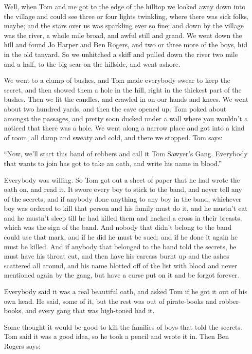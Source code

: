 \documentclass[10pt,a4paper]{article}
\begin{document}
Well, when Tom and me got to the edge of the hilltop we looked away down into the village and could see three or four lights twinkling, where there was sick folks, maybe; and the stars over us was sparkling ever so fine; and down by the village was the river, a whole mile broad, and awful still and grand. We went down the hill and found Jo Harper and Ben Rogers, and two or three more of the boys, hid in the old tanyard. So we unhitched a skiff and pulled down the river two mile and a half, to the big scar on the hillside, and went ashore.

We went to a clump of bushes, and Tom made everybody swear to keep the secret, and then showed them a hole in the hill, right in the thickest part of the bushes. Then we lit the candles, and crawled in on our hands and knees. We went about two hundred yards, and then the cave opened up. Tom poked about amongst the passages, and pretty soon ducked under a wall where you wouldn’t a noticed that there was a hole. We went along a narrow place and got into a kind of room, all damp and sweaty and cold, and there we stopped. Tom says:

“Now, we’ll start this band of robbers and call it Tom Sawyer’s Gang. Everybody that wants to join has got to take an oath, and write his name in blood.”

Everybody was willing. So Tom got out a sheet of paper that he had wrote the oath on, and read it. It swore every boy to stick to the band, and never tell any of the secrets; and if anybody done anything to any boy in the band, whichever boy was ordered to kill that person and his family must do it, and he mustn’t eat and he mustn’t sleep till he had killed them and hacked a cross in their breasts, which was the sign of the band. And nobody that didn’t belong to the band could use that mark, and if he did he must be sued; and if he done it again he must be killed. And if anybody that belonged to the band told the secrets, he must have his throat cut, and then have his carcass burnt up and the ashes scattered all around, and his name blotted off of the list with blood and never mentioned again by the gang, but have a curse put on it and be forgot forever.

Everybody said it was a real beautiful oath, and asked Tom if he got it out of his own head. He said, some of it, but the rest was out of pirate-books and robber-books, and every gang that was high-toned had it.

Some thought it would be good to kill the families of boys that told the secrets. Tom said it was a good idea, so he took a pencil and wrote it in. Then Ben Rogers says:
\end{document}
